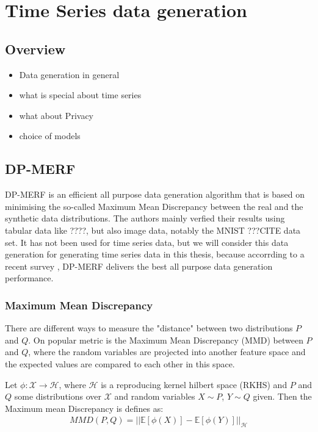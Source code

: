 \section[(Time Series) Data generation]{Time Series data generation} \label{chapter3}
\subsection{Overview}
    \begin{itemize}
        \item Data generation in general
        \item what is special about time series
        \item what about Privacy
        \item choice of models
    \end{itemize}
\subsection{DP-MERF}

DP-MERF \parencite{dpmerf} is an efficient all purpose data generation algorithm that is based on minimising the so-called Maximum Mean Discrepancy between the real and the synthetic data distributions. The authors mainly verfied their results using tabular data like ????, but also image data, notably the MNIST ???CITE data set. It has not been used for time series data, but we will consider this data generation for generating time series data in this thesis, because accorrding to a recent survey \parencite{hu2023sok}, DP-MERF delivers the best all purpose data generation performance.

\subsubsection{Maximum Mean Discrepancy}
There are different ways to measure the "distance" between two distributions $P$ and $Q$. On popular metric is the Maximum Mean Discrepancy (MMD) between $P$ and $Q$, where the random variables are projected into another feature space and the expected values are compared to each other in this space.

\begin{definition}[MMD]
    Let $\phi: \mathcal{X} \rightarrow \mathcal{H}$, where $\mathcal{H}$ is a reproducing kernel hilbert space (RKHS) and $P$ and $Q$ some distributions over $\mathcal{X}$ and random variables $X \sim P$, $Y \sim Q$ given. Then the Maximum mean Discrepancy is defines as:
    \begin{align}
        MMD(P,Q)=|| \mathbb{E}[\phi(X)] - \mathbb{E}[\phi(Y)] ||_\mathcal{H}
    \end{align}
\end{definition}

